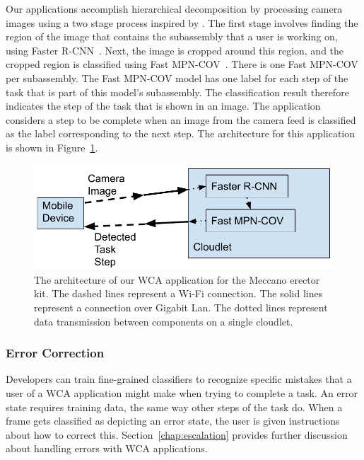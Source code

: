 Our applications accomplish hierarchical decomposition by processing camera
images using a two stage process inspired by \citet{gebru2017finegrained}.
The first stage involves finding the region of the
image that contains the subassembly that a user is working on, using Faster
R-CNN~\cite{frcnn}.
Next, the image is cropped around this region, and the cropped region is
classified using Fast MPN-COV~\cite{Li_2018_CVPR}.
There is one Fast MPN-COV per subassembly.
The Fast MPN-COV model has one label for each step of the task that is part of
this model's subassembly.
The classification result therefore indicates the step of the task that is shown
in an image.
The application considers a step to be complete when an image from the camera
feed is classified as the label corresponding to the next step.
The architecture for this application is shown in Figure~\ref{fig:arch}.

\begin{figure}
  \includegraphics[width=\columnwidth]{figures/architecture.pdf}
  \caption{
    The architecture of our WCA application for the Meccano erector kit.
    The dashed lines represent a Wi-Fi connection.
    The solid lines represent a connection over Gigabit Lan.
    The dotted lines represent data transmission between components on a single
    cloudlet.
  }\label{fig:arch}
\end{figure}

\subsubsection{Error Correction}

Developers can train fine-grained classifiers to recognize specific mistakes
that a user of a WCA application might make when trying to complete a task.
An error state requires training data, the same way other steps of the task do.
When a frame gets classified as depicting an error state, the user is given
instructions about how to correct this.
Section~\ref{chap:escalation} provides further discussion about handling errors
with WCA applications.

